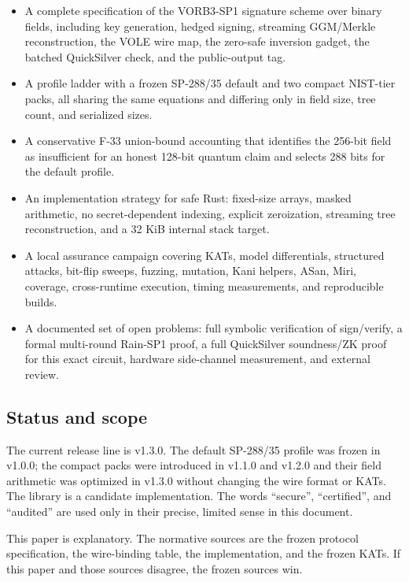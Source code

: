 \documentclass[11pt,a4paper]{article}
\begin{document}
\begin{itemize}
  \item A complete specification of the VORB3-SP1 signature scheme over
        binary fields, including key generation, hedged signing, streaming
        GGM/Merkle reconstruction, the VOLE wire map, the zero-safe inversion
        gadget, the batched QuickSilver check, and the public-output tag.
  \item A profile ladder with a frozen SP-288/35 default and two compact
        NIST-tier packs, all sharing the same equations and differing only in
        field size, tree count, and serialized sizes.
  \item A conservative F-33 union-bound accounting that identifies the
        256-bit field as insufficient for an honest 128-bit quantum claim and
        selects 288 bits for the default profile.
  \item An implementation strategy for safe Rust: fixed-size arrays, masked
        arithmetic, no secret-dependent indexing, explicit zeroization,
        streaming tree reconstruction, and a 32 KiB internal stack target.
  \item A local assurance campaign covering KATs, model differentials,
        structured attacks, bit-flip sweeps, fuzzing, mutation, Kani helpers,
        ASan, Miri, coverage, cross-runtime execution, timing measurements,
        and reproducible builds.
  \item A documented set of open problems: full symbolic verification of
        sign/verify, a formal multi-round Rain-SP1 proof, a full QuickSilver
        soundness/ZK proof for this exact circuit, hardware side-channel
        measurement, and external review.
\end{itemize}

\subsection{Status and scope}

The current release line is v1.3.0. The default SP-288/35 profile was frozen
in v1.0.0; the compact packs were introduced in v1.1.0 and v1.2.0 and their
field arithmetic was optimized in v1.3.0 without changing the wire format or
KATs. The library is a candidate implementation. The words ``secure'',
``certified'', and ``audited'' are used only in their precise, limited sense
in this document.

This paper is explanatory. The normative sources are the frozen protocol
specification, the wire-binding table, the implementation, and the frozen
KATs. If this paper and those sources disagree, the frozen sources win.
\end{document}
